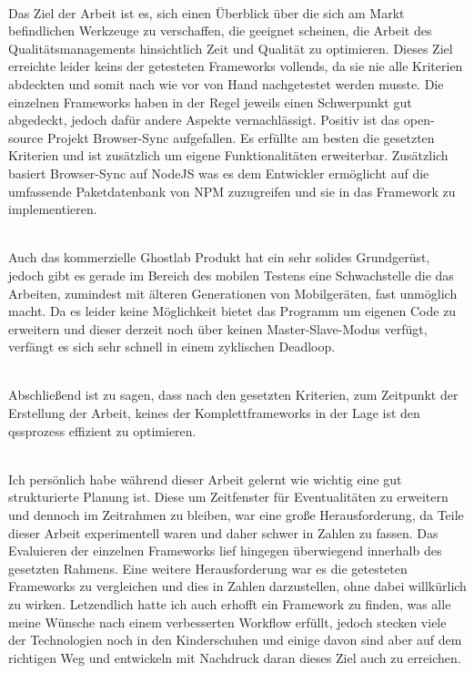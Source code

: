 \\
Das Ziel der Arbeit ist es, sich einen Überblick über die sich am Markt befindlichen Werkzeuge zu verschaffen, die geeignet scheinen, die Arbeit des Qualitätsmanagements hinsichtlich Zeit und Qualität zu optimieren. Dieses Ziel erreichte leider keins der getesteten \Gls{Framework}s vollends, da sie nie alle Kriterien abdeckten und somit nach wie vor von Hand nachgetestet werden musste. 
Die einzelnen \Gls{Framework}s haben in der Regel jeweils einen Schwerpunkt gut abgedeckt, jedoch dafür andere Aspekte vernachlässigt. Positiv ist das open-source Projekt Browser-Sync aufgefallen. Es erfüllte am besten die gesetzten Kriterien und ist zusätzlich um eigene Funktionalitäten erweiterbar. Zusätzlich basiert Browser-Sync auf \gls{NodeJS} was es dem Entwickler ermöglicht auf die umfassende Paketdatenbank von \Gls{NPM} zuzugreifen und sie in das \Gls{Framework} zu implementieren. 

\\Auch das kommerzielle Ghostlab Produkt hat ein sehr solides Grundgerüst, jedoch gibt es gerade im Bereich des mobilen Testens eine Schwachstelle die das Arbeiten, zumindest mit älteren Generationen von Mobilgeräten, fast unmöglich macht. Da es leider keine Möglichkeit bietet das Programm um eigenen Code zu erweitern und dieser derzeit noch über keinen Master-Slave-Modus verfügt, verfängt es sich sehr schnell in einem zyklischen Deadloop.

\\Abschließend ist zu sagen, dass nach den gesetzten Kriterien, zum Zeitpunkt der Erstellung der Arbeit, keines der Komplettframeworks in der Lage ist den \Gls{qs}sprozess effizient zu optimieren.

\\Ich persönlich habe während dieser Arbeit gelernt wie wichtig eine gut strukturierte Planung ist. Diese um Zeitfenster für Eventualitäten zu erweitern und dennoch im Zeitrahmen zu bleiben, war eine große Herausforderung, da Teile dieser Arbeit experimentell waren und daher schwer in Zahlen zu fassen. Das Evaluieren der einzelnen \Gls{Framework}s lief hingegen überwiegend innerhalb des gesetzten Rahmens. Eine weitere Herausforderung war es die getesteten \Gls{Framework}s zu vergleichen und dies in Zahlen darzustellen, ohne dabei willkürlich zu wirken. Letzendlich hatte ich auch erhofft ein \Gls{Framework} zu finden, was alle meine Wünsche nach einem verbesserten Workflow erfüllt, jedoch stecken viele der Technologien noch in den Kinderschuhen und einige davon sind aber auf dem richtigen Weg und entwickeln mit Nachdruck daran dieses Ziel auch zu erreichen.


